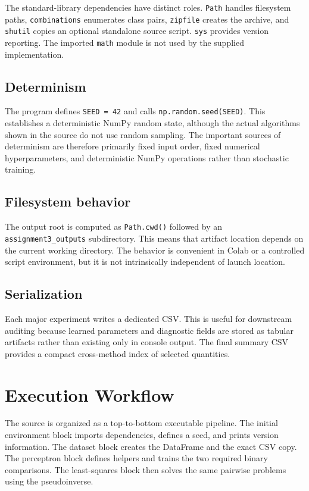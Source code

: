 \documentclass[11pt,a4paper]{article}
\newcommand{\code}[1]{\texttt{#1}}
\begin{document}
The standard-library dependencies have distinct roles. \code{Path} handles filesystem paths, \code{combinations} enumerates class pairs, \code{zipfile} creates the archive, and \code{shutil} copies an optional standalone source script. \code{sys} provides version reporting. The imported \code{math} module is not used by the supplied implementation.

\subsection{Determinism}
The program defines \code{SEED = 42} and calls \code{np.random.seed(SEED)}. This establishes a deterministic NumPy random state, although the actual algorithms shown in the source do not use random sampling. The important sources of determinism are therefore primarily fixed input order, fixed numerical hyperparameters, and deterministic NumPy operations rather than stochastic training.

\subsection{Filesystem behavior}
The output root is computed as \code{Path.cwd()} followed by an \code{assignment3\_outputs} subdirectory. This means that artifact location depends on the current working directory. The behavior is convenient in Colab or a controlled script environment, but it is not intrinsically independent of launch location.

\subsection{Serialization}
Each major experiment writes a dedicated CSV. This is useful for downstream auditing because learned parameters and diagnostic fields are stored as tabular artifacts rather than existing only in console output. The final summary CSV provides a compact cross-method index of selected quantities.

\section{Execution Workflow}
The source is organized as a top-to-bottom executable pipeline. The initial environment block imports dependencies, defines a seed, and prints version information. The dataset block creates the DataFrame and the exact CSV copy. The perceptron block defines helpers and trains the two required binary comparisons. The least-squares block then solves the same pairwise problems using the pseudoinverse.
\end{document}
